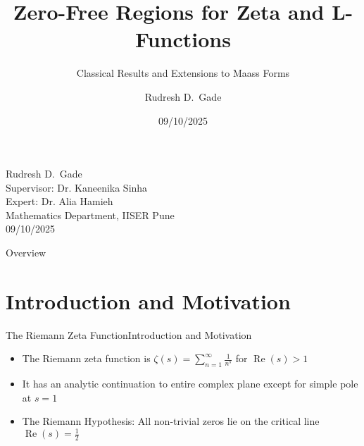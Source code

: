 \documentclass{beamer}
\title{Zero-Free Regions for Zeta and L-Functions}
\subtitle{Classical Results and Extensions to Maass Forms}
\author{Rudresh D.\ Gade }
\date{09/10/2025}
\def\Re{\operatorname{Re}}
\begin{document}
\begin{frame}[plain]
  \vfill

  \begin{center}
  \end{center}

  \vfill

  \begin{center}
    {\large Rudresh D.\ Gade}\\[0.2cm]
    {\large Supervisor: Dr. Kaneenika Sinha}\\[0.2cm]
    {\large Expert: Dr. Alia Hamieh}\\[0.2cm]

    Mathematics Department, IISER Pune\\[0.6cm]
    {\large 09/10/2025}
  \end{center}

  \vspace*{0.5cm}
\end{frame}

\begin{frame}{Overview}
\tableofcontents
\end{frame}

\section{Introduction and Motivation}

\begin{frame}{The Riemann Zeta Function}{Introduction and Motivation}
\begin{itemize}
\item The Riemann zeta function is $\zeta(s) = \sum_{n=1}^{\infty} \frac{1}{n^s}$ for $\Re(s) > 1$
\item It has an analytic continuation to entire complex plane except for simple pole at $s = 1$
\item The Riemann Hypothesis: All non-trivial zeros lie on the critical line $\Re(s) = \frac{1}{2}$
\end{itemize}

\end{frame}
\end{document}

